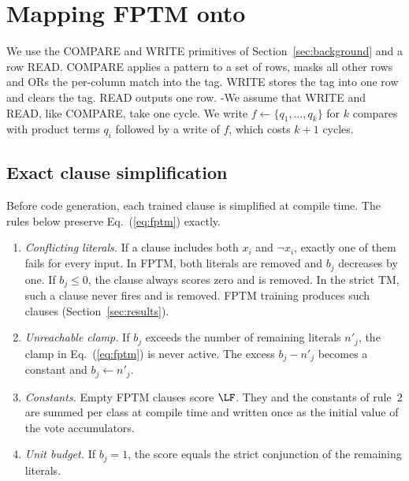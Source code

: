 \section{Mapping FPTM onto \gainp{}}\label{sec:mapping}

We use the COMPARE and WRITE primitives of Section~\ref{sec:background} and a row READ.
COMPARE applies a pattern to a set of rows, masks all other rows and ORs the per-column match into the tag.
WRITE stores the tag into one row and clears the tag.
READ outputs one row.
\hyp{We assume that WRITE and READ, like COMPARE, take one cycle.}
We write $f \leftarrow \{q_1,\dots,q_k\}$ for $k$ compares with product terms $q_i$ followed by a write of $f$, which costs $k+1$ cycles.

\subsection{Exact clause simplification}\label{sec:norm}
Before code generation, each trained clause is simplified at compile time.
The rules below preserve Eq.~(\ref{eq:fptm}) exactly.
\begin{enumerate}
\item \emph{Conflicting literals.} If a clause includes both $x_i$ and $\lnot x_i$, exactly one of them fails for every input.
In FPTM, both literals are removed and $b_j$ decreases by one. If $b_j\le0$, the clause always scores zero and is removed.
In the strict TM, such a clause never fires and is removed.
FPTM training produces such clauses (Section~\ref{sec:results}).
\item \emph{Unreachable clamp.} If $b_j$ exceeds the number of remaining literals $n'_j$, the clamp in Eq.~(\ref{eq:fptm}) is never active. The excess $b_j-n'_j$ becomes a constant and $b_j\leftarrow n'_j$.
\item \emph{Constants.} Empty FPTM clauses score $\LF$. They and the constants of rule~2 are summed per class at compile time and written once as the initial value of the vote accumulators.
\item \emph{Unit budget.} If $b_j=1$, the score equals the strict conjunction of the remaining literals.
\end{enumerate}

